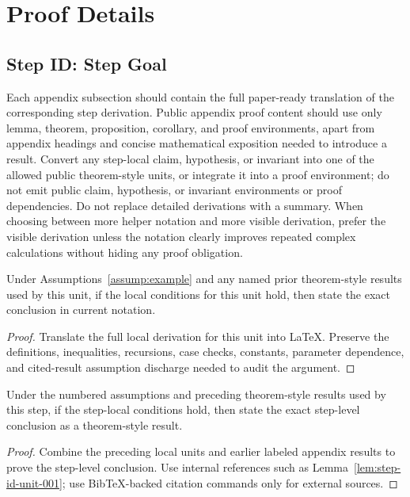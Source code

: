 \appendix

\section{Proof Details}

\subsection{Step ID: Step Goal}\label{app:step-id}

Each appendix subsection should contain the full paper-ready translation of the
corresponding step derivation. Public appendix proof content should use only
lemma, theorem, proposition, corollary, and proof environments, apart from
appendix headings and concise mathematical exposition needed to introduce a
result. Convert any step-local claim, hypothesis, or invariant into one of the
allowed public theorem-style units, or integrate it into a proof environment;
do not emit public claim, hypothesis, or invariant environments or proof
dependencies. Do not replace detailed derivations with a summary. When choosing
between more helper notation and more visible derivation, prefer the visible
derivation unless the notation clearly improves repeated complex calculations
without hiding any proof obligation.

\begin{lemma}\label{lem:step-id-unit-001}
Under Assumptions~\ref{assump:example} and any named prior theorem-style
results used by this unit, if the local conditions for this unit hold, then
state the exact conclusion in current notation.
\end{lemma}

\begin{proof}
Translate the full local derivation for this unit into LaTeX. Preserve the
definitions, inequalities, recursions, case checks, constants, parameter
dependence, and cited-result assumption discharge needed to audit the argument.
\end{proof}

\begin{proposition}\label{prop:step-id-assembly}
Under the numbered assumptions and preceding theorem-style results used by this
step, if the step-local conditions hold, then state the exact step-level
conclusion as a theorem-style result.
\end{proposition}

\begin{proof}
Combine the preceding local units and earlier labeled appendix results to prove
the step-level conclusion. Use internal references such as
Lemma~\ref{lem:step-id-unit-001}; use BibTeX-backed citation commands only for
external sources.
\end{proof}

